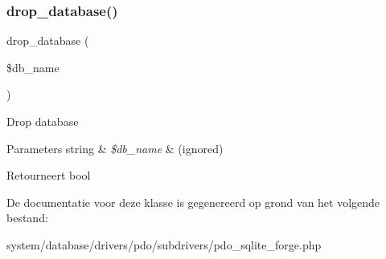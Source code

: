 \subsubsection{\texorpdfstring{drop\_database()}{drop\_database()}}
{\footnotesize\ttfamily drop\+\_\+database (\begin{DoxyParamCaption}\item[{}]{\$db\+\_\+name }\end{DoxyParamCaption})}

Drop database


\begin{DoxyParams}[1]{Parameters}
string & {\em \$db\+\_\+name} & (ignored) \\
\hline
\end{DoxyParams}
\begin{DoxyReturn}{Retourneert}
bool 
\end{DoxyReturn}


De documentatie voor deze klasse is gegenereerd op grond van het volgende bestand\+:\begin{DoxyCompactItemize}
\item 
system/database/drivers/pdo/subdrivers/pdo\+\_\+sqlite\+\_\+forge.\+php\end{DoxyCompactItemize}
